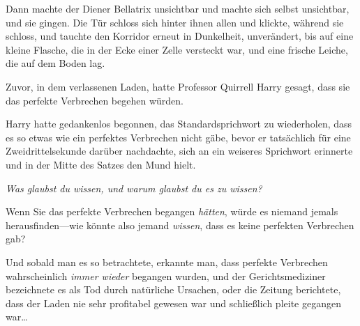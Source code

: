 Dann machte der Diener Bellatrix unsichtbar und machte sich selbst unsichtbar, und sie gingen. Die Tür schloss sich hinter ihnen allen und klickte, während sie schloss, und tauchte den Korridor erneut in Dunkelheit, unverändert, bis auf eine kleine Flasche, die in der Ecke einer Zelle versteckt war, und eine frische Leiche, die auf dem Boden lag.

\later

Zuvor, in dem verlassenen Laden, hatte Professor Quirrell Harry gesagt, dass sie das perfekte Verbrechen begehen würden.

Harry hatte gedankenlos begonnen, das Standardsprichwort zu wiederholen, dass es so etwas wie ein perfektes Verbrechen nicht gäbe, bevor er tatsächlich für eine Zweidrittelsekunde darüber nachdachte, sich an ein weiseres Sprichwort erinnerte und in der Mitte des Satzes den Mund hielt.

\emph{Was glaubst du wissen, und warum glaubst du es zu wissen?}

Wenn Sie das perfekte Verbrechen begangen \emph{hätten}, würde es niemand jemals herausfinden—wie könnte also jemand \emph{wissen}, dass es keine perfekten Verbrechen gab?

Und sobald man es so betrachtete, erkannte man, dass perfekte Verbrechen wahrscheinlich \emph{immer wieder} begangen wurden, und der Gerichtsmediziner bezeichnete es als Tod durch natürliche Ursachen, oder die Zeitung berichtete, dass der Laden nie sehr profitabel gewesen war und schließlich pleite gegangen war…

